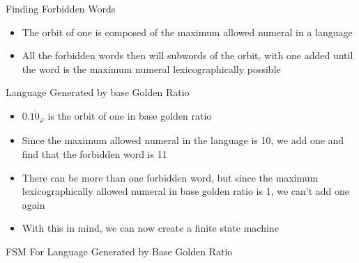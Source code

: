 \documentclass{beamer}
\begin{document}
\begin{frame}{Finding Forbidden Words}
  \begin{itemize}
    \item The orbit of one is composed of the maximum allowed numeral in a language \pause
    \item All the forbidden words then will subwords of the orbit, with one added until the word is the maximum numeral lexicographically possible
  \end{itemize}
\end{frame}

\begin{frame}{Language Generated by base Golden Ratio}
  \begin{itemize}
    \item $0.\overline{10}_\varphi$ is the orbit of one in base golden ratio \pause
    \item Since the maximum allowed numeral in the language is 10, we add one and find that the forbidden word is 11 \pause
    \item There can be more than one forbidden word, but since the maximum lexicographically allowed numeral in base golden ratio is 1, we can't add one again \pause
    \item With this in mind, we can now create a finite state machine
  \end{itemize}
\end{frame}

\begin{frame}{FSM For Language Generated by Base Golden Ratio}
  \begin{center}
  \end{center}
\end{frame}
\end{document}
